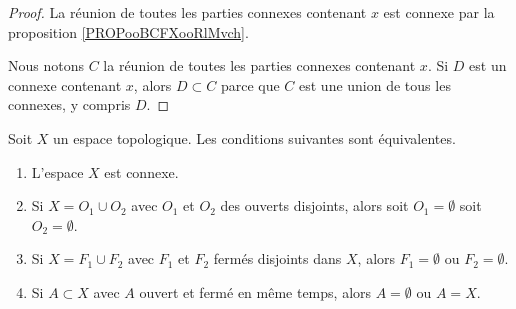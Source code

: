 \begin{proof}
	La réunion de toutes les parties connexes contenant \( x\) est connexe par la proposition \ref{PROPooBCFXooRlMvch}.

	Nous notons \( C\) la réunion de toutes les parties connexes contenant \( x\). Si \( D\) est un connexe contenant \( x\), alors \( D\subset C\) parce que \( C\) est une union de tous les connexes, y compris \( D\).
\end{proof}

\begin{proposition} \label{PropHSjJcIr}
	Soit \( X\) un espace topologique. Les conditions suivantes sont équivalentes.
	\begin{enumerate}
		\item       \label{ITEMooXHIKooGqrgTs}
		      L'espace \( X\) est connexe.
		\item       \label{ITEMooRTNPooADKVnw}
		      Si \( X=O_1\cup O_2\) avec \( O_1\) et \( O_2\) des ouverts disjoints, alors soit \( O_1=\emptyset\) soit \( O_2=\emptyset\).
		\item       \label{ITEMooOEZYooFBNaOZ}
		      Si \( X=F_1\cup F_2\) avec \( F_1\) et \( F_2\) fermés disjoints dans \( X\), alors \( F_1=\emptyset\) ou \( F_2=\emptyset\).
		\item       \label{ITEMooNIPZooIDPmEf}
		      Si \( A\subset X\) avec \( A\) ouvert et fermé en même temps, alors \( A=\emptyset\) ou \( A=X\).
	\end{enumerate}
\end{proposition}

